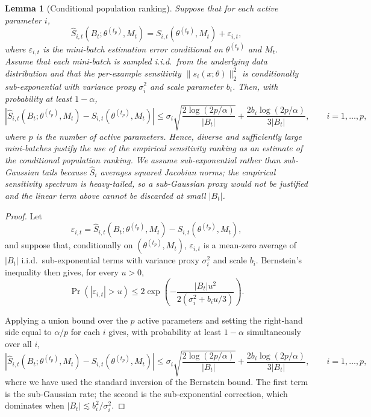 \documentclass{article}
\newtheorem{lemma}[theorem]{Lemma}
\theoremstyle{definition}
\theoremstyle{remark}
\begin{document}
\begin{lemma}[Conditional population ranking]
    Suppose that for each active parameter $i$,
\begin{equation}
    \widehat S_{i,t}(B_t;\theta^{(t_p)},M_t)
    =
    S_{i,t}(\theta^{(t_p)},M_t)
    +
    \varepsilon_{i,t},
\end{equation}
where $\varepsilon_{i,t}$ is the mini-batch estimation error conditional on
$\theta^{(t_p)}$ and $M_t$. Assume that each mini-batch is sampled i.i.d.\ from the underlying data
distribution and that the per-example sensitivity $\|s_i(x;\theta)\|_2^2$ is
conditionally sub-exponential with variance proxy $\sigma_i^2$ and scale
parameter $b_i$. Then, with probability at least $1-\alpha$,
\begin{equation}
    \left|
        \widehat S_{i,t}(B_t;\theta^{(t_p)},M_t)
        -
        S_{i,t}(\theta^{(t_p)},M_t)
    \right|
    \leq
    \sigma_i
    \sqrt{
        \frac{2\log(2p/\alpha)}{|B_t|}
    }
    +
    \frac{2 b_i \log(2p/\alpha)}{3|B_t|},
    \qquad i=1,\ldots,p,
\end{equation}
where $p$ is the number of active parameters. Hence, diverse and sufficiently
large mini-batches justify the use of the empirical sensitivity ranking as an
estimate of the conditional population ranking. We assume sub-exponential
rather than sub-Gaussian tails because $\widehat S_{i}$ averages \emph{squared}
Jacobian norms; the empirical sensitivity spectrum is heavy-tailed, so a
sub-Gaussian proxy would not be justified and the linear term above cannot be
discarded at small $|B_t|$.
\end{lemma}

\begin{proof}
Let
\[
\varepsilon_{i,t}
=
\widehat S_{i,t}(B_t;\theta^{(t_p)},M_t)
-
S_{i,t}(\theta^{(t_p)},M_t),
\]
and suppose that, conditionally on $(\theta^{(t_p)},M_t)$,
$\varepsilon_{i,t}$ is a mean-zero average of $|B_t|$ i.i.d.\ sub-exponential
terms with variance proxy $\sigma_i^2$ and scale $b_i$. Bernstein's inequality
then gives, for every $u>0$,
\[
\Pr\!\left(
    |\varepsilon_{i,t}| > u
\right)
\le
2\exp\!\left(
    -\frac{|B_t|u^2}{2\left(\sigma_i^2 + b_i u/3\right)}
\right).
\]

Applying a union bound over the $p$ active parameters and setting the right-hand
side equal to $\alpha/p$ for each $i$ gives, with probability at least
$1-\alpha$ simultaneously over all $i$,
\[
\left|
    \widehat S_{i,t}(B_t;\theta^{(t_p)},M_t)
    -
    S_{i,t}(\theta^{(t_p)},M_t)
\right|
\le
\sigma_i
\sqrt{
    \frac{2\log(2p/\alpha)}{|B_t|}
}
+
\frac{2 b_i\log(2p/\alpha)}{3|B_t|},
\qquad i=1,\ldots,p,
\]
where we have used the standard inversion of the Bernstein bound. The first
term is the sub-Gaussian rate; the second is the sub-exponential correction,
which dominates when $|B_t| \lesssim b_i^2/\sigma_i^2$.
\end{proof}
\end{document}
